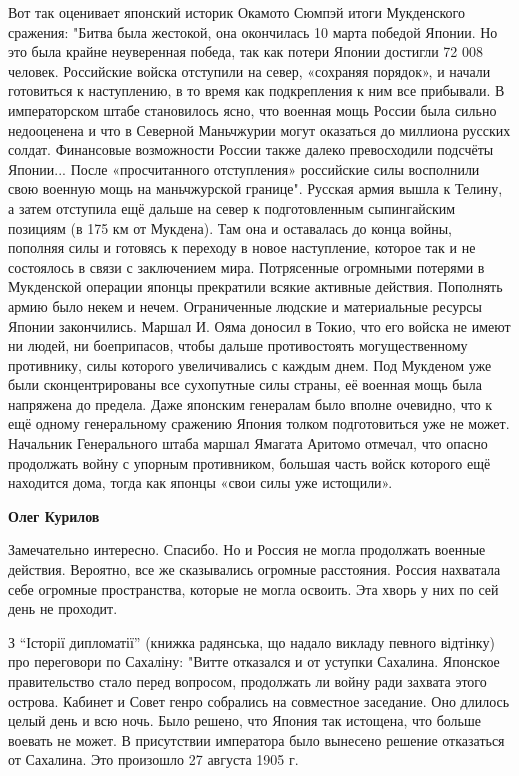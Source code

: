 \begin{itemize}
\begin{itemize}
\begin{itemize}
Вот так оценивает японский историк Окамото Сюмпэй итоги Мукденского сражения:
"Битва была жестокой, она окончилась 10 марта победой Японии. Но это была
крайне неуверенная победа, так как потери Японии достигли 72 008 человек.
Российские войска отступили на север, «сохраняя порядок», и начали готовиться к
наступлению, в то время как подкрепления к ним все прибывали. В императорском
штабе становилось ясно, что военная мощь России была сильно недооценена и что в
Северной Маньчжурии могут оказаться до миллиона русских солдат. Финансовые
возможности России также далеко превосходили подсчёты Японии... После
«просчитанного отступления» российские силы восполнили свою военную мощь на
маньчжурской границе". Русская армия вышла к Телину, а затем отступила ещё
дальше на север к подготовленным сыпингайским позициям (в 175 км от Мукдена).
Там она и оставалась до конца войны, пополняя силы и готовясь к переходу в
новое наступление, которое так и не состоялось в связи с заключением мира.
Потрясенные огромными потерями в Мукденской операции японцы прекратили всякие
активные действия. Пополнять армию было некем и нечем. Ограниченные людские и
материальные ресурсы Японии закончились. Маршал И. Ояма доносил в Токио, что
его войска не имеют ни людей, ни боеприпасов, чтобы дальше противостоять
могущественному противнику, силы которого увеличивались с каждым днем. Под
Мукденом уже были сконцентрированы все сухопутные силы страны, её военная мощь
была напряжена до предела. Даже японским генералам было вполне очевидно, что к
ещё одному генеральному сражению Япония толком подготовиться уже не может.
Начальник Генерального штаба маршал Ямагата Аритомо отмечал, что опасно
продолжать войну с упорным противником, большая часть войск которого ещё
находится дома, тогда как японцы «свои силы уже истощили».

\textbf{Олег Курилов} 

Замечательно интересно. Спасибо. Но и Россия не могла продолжать военные
действия. Вероятно, все же сказывались огромные расстояния. Россия нахватала
себе огромные пространства, которые не могла освоить. Эта хворь у них по сей
день не проходит.

\end{itemize} %

\end{itemize} %


З \enquote{Історії дипломатії} (книжка радянська, що надало викладу певного відтінку)
про переговори по Сахаліну: "Витте отказался и от уступки Сахалина. Японское
правительство стало перед вопросом, продолжать ли войну ради захвата этого
острова. Кабинет и Совет генро собрались на совместное заседание. Оно длилось
целый день и всю ночь. Было решено, что Япония так истощена, что больше воевать
не может. В присутствии императора было вынесено решение отказаться от
Сахалина. Это произошло 27 августа 1905 г.


\end{itemize}
